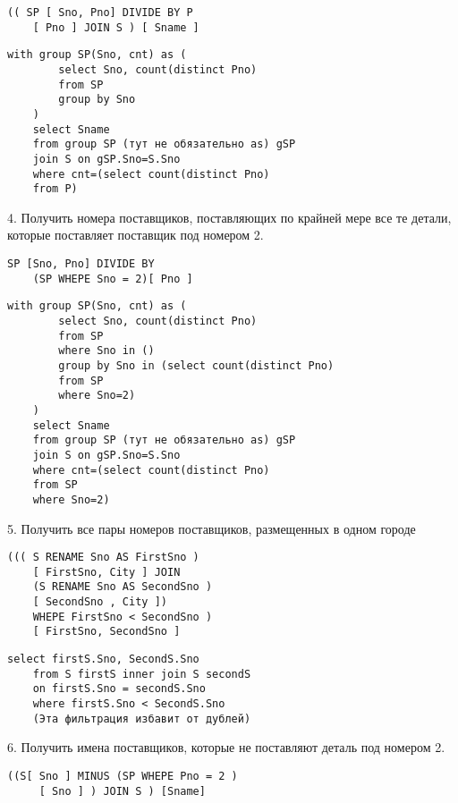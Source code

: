 \begin{lstlisting}[label=some-code,caption=Пример 3]
	(( SP [ Sno, Рno] DIVIDE BY Р 
	[ Рno ] JOIN S ) [ Sname ]
\end{lstlisting}

\begin{lstlisting}[label=some-code,caption=Пример 3]
	with group SP(Sno, cnt) as (
		select Sno, count(distinct Pno)
		from SP
		group by Sno
	)
	select Sname
	from group SP (тут не обязательно as) gSP 
	join S on gSP.Sno=S.Sno
	where cnt=(select count(distinct Pno)
	from P)	
\end{lstlisting}

4. Получить номера поставщиков, поставляющих по крайней мере все те детали, которые поставляет поставщик под
номером 2.

\begin{lstlisting}[label=some-code,caption=Пример 4]
	SP [Sno, Рno] DIVIDE ВY 
	(SP WНEPE Sno = 2)[ Рno ]
\end{lstlisting}

\begin{lstlisting}[label=some-code,caption=Пример 4]
	with group SP(Sno, cnt) as (
		select Sno, count(distinct Pno)
		from SP
		where Sno in ()
		group by Sno in (select count(distinct Pno)
		from SP
		where Sno=2)
	)
	select Sname
	from group SP (тут не обязательно as) gSP 
	join S on gSP.Sno=S.Sno
	where cnt=(select count(distinct Pno)
	from SP
	where Sno=2)	
\end{lstlisting}

5. Получить все пары номеров поставщиков, размещенных в одном городе

\begin{lstlisting}[label=some-code,caption=Пример 5]
	((( S RENAМE Sno AS FirstSno ) 
	[ FirstSno, City ] JOIN
	(S RENAМE Sno AS SecondSno ) 
	[ SecondSno , City ])
	WНEPE FirstSno < SecondSno )
	[ FirstSno, SecondSno ]
\end{lstlisting}

\begin{lstlisting}[label=some-code,caption=Пример 5]
	select firstS.Sno, SecondS.Sno
	from S firstS inner join S secondS
	on firstS.Sno = secondS.Sno
	where firstS.Sno < SecondS.Sno 
	(Эта фильтрация избавит от дублей)
\end{lstlisting}


6. Получить имена поставщиков, которые не поставляют деталь под номером 2.

\begin{lstlisting}[label=some-code,caption=Пример 6]
	((S[ Sno ] MINUS (SP WНEPE Рno = 2 )
	 [ Sno ] ) JOIN S ) [Sname]
\end{lstlisting}

